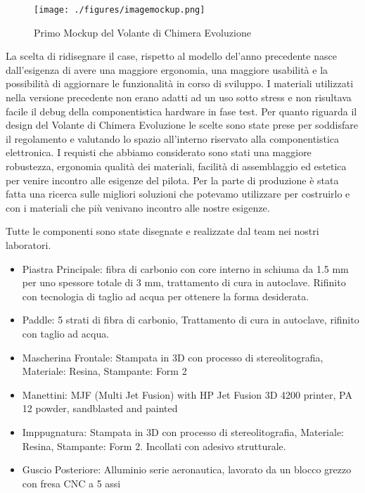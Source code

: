 \begin{figure}[hbt!]
    \centering
    \texttt{[image: ./figures/imagemockup.png]}
    \caption{Primo Mockup del Volante di Chimera Evoluzione}
\end{figure}


La scelta di ridisegnare il case, rispetto al modello del'anno precedente 
nasce dall'esigenza di avere una maggiore ergonomia, una maggiore usabilità
e la possibilità di aggiornare le funzionalità in corso di sviluppo.
I materiali utilizzati nella versione precedente non erano adatti 
ad un uso sotto stress e non risultava facile il debug della componentistica hardware
in fase test. 
Per quanto riguarda il design del Volante di Chimera Evoluzione le scelte 
sono state prese per soddisfare il regolamento e valutando lo spazio all'interno
riservato alla componentistica elettronica.
I requisti che abbiamo considerato sono stati una maggiore robustezza, ergonomia
qualità dei materiali, facilità di assemblaggio ed estetica per venire incontro 
alle esigenze del pilota.
Per la parte di produzione è stata fatta una ricerca sulle migliori soluzioni che potevamo
utilizzare per costruirlo e con i materiali che più venivano incontro alle nostre esigenze.

Tutte le componenti sono state disegnate e realizzate dal team nei nostri laboratori.

\begin{itemize}
    \item Piastra Principale: fibra di carbonio con core interno in schiuma da 1.5 mm per uno spessore totale di 3 mm, trattamento di cura in autoclave. Rifinito con tecnologia di taglio ad acqua per ottenere la forma desiderata.
    \item Paddle: 5 strati di fibra di carbonio, Trattamento di cura in autoclave, rifinito con taglio ad acqua.
    \item Mascherina Frontale: Stampata in 3D con processo di stereolitografia, Materiale: Resina, Stampante: Form 2
    \item Manettini: MJF (Multi Jet Fusion) with HP Jet Fusion 3D 4200 printer, PA 12 powder, sandblasted and painted
    \item Imppugnatura: Stampata in 3D con processo di stereolitografia, Materiale: Resina, Stampante: Form 2. Incollati con adesivo strutturale.
    \item Guscio Posteriore: Alluminio serie aeronautica, lavorato da un blocco grezzo con fresa CNC a 5 assi
\end{itemize}


